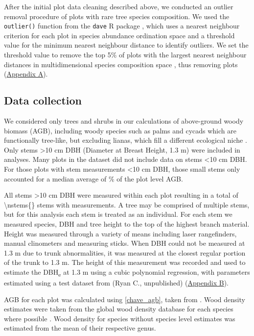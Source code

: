 \documentclass[11pt,a4paper]{article}
\begin{document}
After the initial plot data cleaning described above, we conducted an outlier removal procedure of plots with rare tree species composition. We used the \verb|outlier()| function from the \verb|dave| R package \citep{dave}, which uses a nearest neighbour criterion for each plot in species abundance ordination space and a threshold value for the minimum nearest neighbour distance to identify outliers. We set the threshold value to remove the top 5\% of plots with the largest nearest neighbour distances in multidimensional species composition space \citep{Otto2013}, thus removing \noutliers{} plots (\hyperref[appendixa]{Appendix A}).

\subsection*{Data collection}
 
We considered only trees and shrubs in our calculations of above-ground woody biomass (AGB), including woody species such as palms and cycads which are functionally tree-like, but excluding lianas, which fill a different ecological niche \citep{Selaya2008}. Only stems >10 cm DBH (Diameter at Breast Height, 1.3 m) were included in analyses. Many plots in the dataset did not include data on stems <10 cm DBH. For those plots with stem measurements <10 cm DBH, those small stems only accounted for a median average of \percsmallagb{}\% of the plot level AGB. 

All stems >10 cm DBH were measured within each plot resulting in a total of \num[group-separator={,}]{\nstems{}} stems with measurements. A tree may be comprised of multiple stems, but for this analysis each stem is treated as an individual. For each stem we measured species, DBH and tree height to the top of the highest branch material. Height was measured through a variety of means including laser rangefinders, manual clinometers and measuring sticks. When DBH could not be measured at 1.3 m due to trunk abnormalities, it was measured at the closest regular portion of the trunk to 1.3 m. The height of this measurement was recorded and used to estimate the DBH\textsubscript{e} at 1.3 m using a cubic polynomial regression, with parameters estimated using a test dataset from (Ryan C., unpublished) (\hyperref[appendixb]{Appendix B}).

AGB for each plot was calculated using \autoref{chave_agb}, taken from \citet{Chave2014}. Wood density estimates were taken from the global wood density database for each species where possible \citep{Chave2009, Zanne2009}. Wood density for species without species level estimates was estimated from the mean of their respective genus. 
\end{document}
